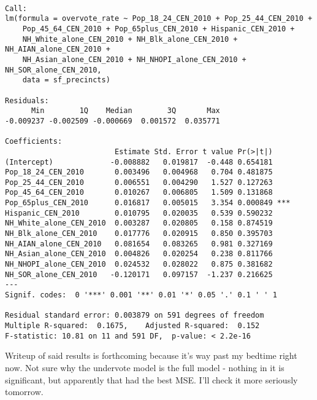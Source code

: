 \documentclass[12pt,twoside]{reedthesis}
\theoremstyle{definition}
\theoremstyle{definition}
\theoremstyle{definition}
\theoremstyle{remark}
\begin{document}
\begin{verbatim}

Call:
lm(formula = overvote_rate ~ Pop_18_24_CEN_2010 + Pop_25_44_CEN_2010 + 
    Pop_45_64_CEN_2010 + Pop_65plus_CEN_2010 + Hispanic_CEN_2010 + 
    NH_White_alone_CEN_2010 + NH_Blk_alone_CEN_2010 + NH_AIAN_alone_CEN_2010 + 
    NH_Asian_alone_CEN_2010 + NH_NHOPI_alone_CEN_2010 + NH_SOR_alone_CEN_2010, 
    data = sf_precincts)

Residuals:
      Min        1Q    Median        3Q       Max 
-0.009237 -0.002509 -0.000669  0.001572  0.035771 

Coefficients:
                         Estimate Std. Error t value Pr(>|t|)    
(Intercept)             -0.008882   0.019817  -0.448 0.654181    
Pop_18_24_CEN_2010       0.003496   0.004968   0.704 0.481875    
Pop_25_44_CEN_2010       0.006551   0.004290   1.527 0.127263    
Pop_45_64_CEN_2010       0.010267   0.006805   1.509 0.131868    
Pop_65plus_CEN_2010      0.016817   0.005015   3.354 0.000849 ***
Hispanic_CEN_2010        0.010795   0.020035   0.539 0.590232    
NH_White_alone_CEN_2010  0.003287   0.020805   0.158 0.874519    
NH_Blk_alone_CEN_2010    0.017776   0.020915   0.850 0.395703    
NH_AIAN_alone_CEN_2010   0.081654   0.083265   0.981 0.327169    
NH_Asian_alone_CEN_2010  0.004826   0.020254   0.238 0.811766    
NH_NHOPI_alone_CEN_2010  0.024532   0.028022   0.875 0.381682    
NH_SOR_alone_CEN_2010   -0.120171   0.097157  -1.237 0.216625    
---
Signif. codes:  0 '***' 0.001 '**' 0.01 '*' 0.05 '.' 0.1 ' ' 1

Residual standard error: 0.003879 on 591 degrees of freedom
Multiple R-squared:  0.1675,    Adjusted R-squared:  0.152 
F-statistic: 10.81 on 11 and 591 DF,  p-value: < 2.2e-16
\end{verbatim}
Writeup of said results is forthcoming because it's way past my bedtime
right now. Not sure why the undervote model is the full model - nothing
in it is significant, but apparently that had the best MSE. I'll check
it more seriously tomorrow.
\end{document}
